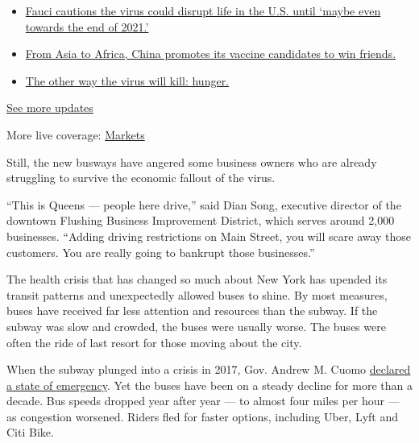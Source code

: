 \begin{itemize}
\tightlist
\item
  \href{https://www.nytimes3xbfgragh.onion/2020/09/11/world/covid-19-coronavirus.html?action=click\&pgtype=Article\&state=default\&region=MAIN_CONTENT_1\&context=storylines_live_updates\#link-dfb8a16}{Fauci
  cautions the virus could disrupt life in the U.S. until `maybe even
  towards the end of 2021.'}
\item
  \href{https://www.nytimes3xbfgragh.onion/2020/09/11/world/covid-19-coronavirus.html?action=click\&pgtype=Article\&state=default\&region=MAIN_CONTENT_1\&context=storylines_live_updates\#link-7104d154}{From
  Asia to Africa, China promotes its vaccine candidates to win friends.}
\item
  \href{https://www.nytimes3xbfgragh.onion/2020/09/11/world/covid-19-coronavirus.html?action=click\&pgtype=Article\&state=default\&region=MAIN_CONTENT_1\&context=storylines_live_updates\#link-393ad215}{The
  other way the virus will kill: hunger.}
\end{itemize}

\href{https://www.nytimes3xbfgragh.onion/2020/09/11/world/covid-19-coronavirus.html?action=click\&pgtype=Article\&state=default\&region=MAIN_CONTENT_1\&context=storylines_live_updates}{See
more updates}

More live coverage:
\href{https://www.nytimes3xbfgragh.onion/live/2020/09/11/business/stock-market-today-coronavirus?action=click\&pgtype=Article\&state=default\&region=MAIN_CONTENT_1\&context=storylines_live_updates}{Markets}

Still, the new busways have angered some business owners who are already
struggling to survive the economic fallout of the virus.

``This is Queens --- people here drive,'' said Dian Song, executive
director of the downtown Flushing Business Improvement District, which
serves around 2,000 businesses. ``Adding driving restrictions on Main
Street, you will scare away those customers. You are really going to
bankrupt those businesses.''

The health crisis that has changed so much about New York has upended
its transit patterns and unexpectedly allowed buses to shine. By most
measures, buses have received far less attention and resources than the
subway. If the subway was slow and crowded, the buses were usually
worse. The buses were often the ride of last resort for those moving
about the city.

When the subway plunged into a crisis in 2017, Gov. Andrew M. Cuomo
\href{https://www.nytimes3xbfgragh.onion/2017/06/29/nyregion/cuomo-declares-a-state-of-emergency-for-the-subway.html}{declared
a state of emergency}. Yet the buses have been on a steady decline for
more than a decade. Bus speeds dropped year after year --- to almost
four miles per hour --- as congestion worsened. Riders fled for faster
options, including Uber, Lyft and Citi Bike.

